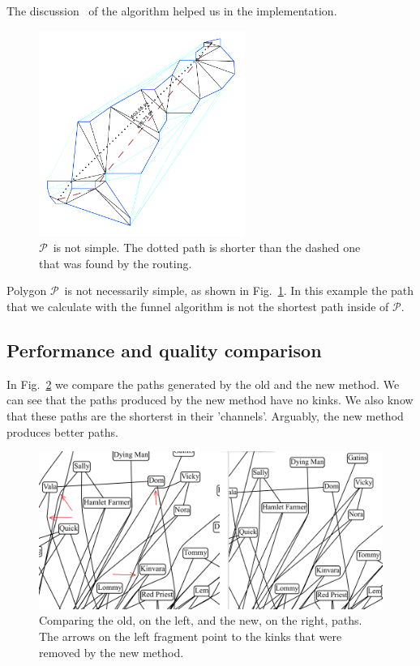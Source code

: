 \documentclass{gd-llncs}
\newcommand{\plg}{$\mathcal{P}$}
\begin{document}
{The discussion~\cite{pathOpt} of the algorithm helped us in the implementation.\\
\begin{figure}[]
  \centering
  \includegraphics*[width=0.6\textwidth]{sleeve_diagonals_not_optimal.pdf}
  \caption{\plg~is not simple. The dotted path is shorter than the dashed one that was found by the routing.}
  \label{fig:non_optimal_path}
\end{figure}
Polygon \plg~is not necessarily simple, as shown in Fig.~\ref{fig:non_optimal_path}.
In this example the path that we calculate with the funnel algorithm is not the shortest path inside of \plg.
\subsection*{Performance and quality comparison}
In Fig.~\ref{fig:improved_routing} we compare the paths generated by the old and the new method. We can see that the paths produced by the new method have no kinks. We also know that these paths are  the shorterst in their 'channels'. Arguably, the new method produces better paths.
\begin{figure}[]
  \centering
  \includegraphics*[width=1\textwidth]{comparison.png}
  \caption{Comparing the old, on the left, and the new, on the right, paths. The arrows on the left fragment point to the kinks that were removed by the new method.}
  \label{fig:improved_routing}
\end{figure}


}
\end{document}
